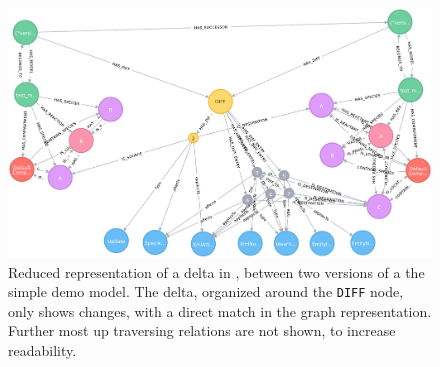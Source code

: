  

\begin{figure}
	\centering
	\includegraphics[width=\textwidth]{resources/neo4j-renders/demo-sbml-simple-diff.pdf}
	\caption[Reduced representation of a delta in \masymos, between two versions of a the simple \sbml demo model]{Reduced representation of a delta in \masymos, between two versions of a the simple \sbml demo model. The delta, organized around the \texttt{DIFF} node, only shows changes, with a direct match in the graph representation. Further most up traversing relations are not shown, to increase readability.}
	\label{fig:results:simple-diff}
\end{figure}